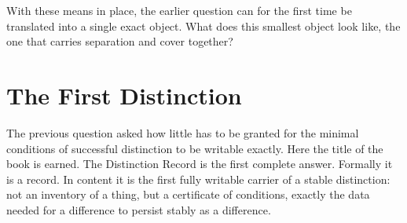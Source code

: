 \documentclass[11pt,a4paper]{book}
\begin{document}
With these means in place, the earlier question can for the first time be
translated into a single exact object. What does this smallest object look
like, the one that carries separation and cover together?

\chapter{The First Distinction}
\label{ch:the-record}

The previous question asked how little has to be granted for the minimal
conditions of successful distinction to be writable exactly. Here the title
of the book is earned. The Distinction Record is the first complete answer.
Formally it is a record. In content it is the first fully writable carrier
of a stable distinction: not an inventory of a thing, but a certificate of
conditions, exactly the data needed for a difference to persist stably as a
difference.

\begin{code}%
\>[0]\AgdaSpace{}%
\AgdaSpace{}%
\AgdaSymbol{:}\AgdaSpace{}%
\AgdaSpace{}%
\<%
\\
\>[0][@{}l@{\AgdaIndent{0}}]%
\>[2]\<%
\\
\>[2][@{}l@{\AgdaIndent{0}}]%
\>[4]%
\>[10]\AgdaSymbol{:}\AgdaSpace{}%
\<%
\\
%
\>[4]%
\>[10]\AgdaSymbol{:}\AgdaSpace{}%
\<%
\\
%
\>[4]%
\>[10]\AgdaSymbol{:}\AgdaSpace{}%
\<%
\\
%
\>[4]%
\>[10]\AgdaSymbol{:}\AgdaSpace{}%
\AgdaSpace{}%
\AgdaSpace{}%
\<%
\\
%
\>[4]\AgdaSpace{}%
\AgdaSymbol{:}\AgdaSpace{}%
\AgdaSymbol{(}\AgdaSpace{}%
\AgdaSymbol{:}\AgdaSpace{}%
\AgdaSymbol{)}\AgdaSpace{}%
\AgdaSpace{}%
\AgdaSymbol{(}\AgdaSpace{}%
\AgdaSpace{}%
\AgdaSymbol{)}\AgdaSpace{}%
\AgdaSpace{}%
\AgdaSymbol{(}\AgdaSpace{}%
\AgdaSpace{}%
\AgdaSymbol{)}\<%
\\
%
\\[\AgdaEmptyExtraSkip]%
\>[0]\AgdaSpace{}%
\AgdaSpace{}%
\<%
\end{code}
\end{document}
